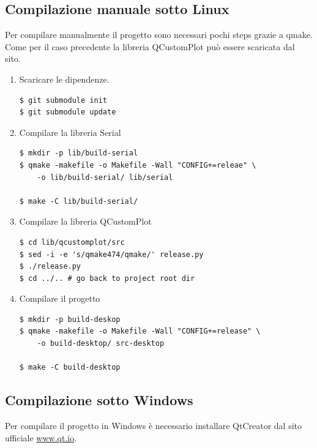 \subsection{Compilazione manuale sotto Linux}
Per compilare manualmente il progetto sono necessari pochi steps grazie a
qmake. Come per il caso precedente la libreria QCustomPlot pu\`o essere
scaricata dal sito.

\begin{enumerate}
\item Scaricare le dipendenze.
\begin{Verbatim}[frame=single]
$ git submodule init
$ git submodule update
\end{Verbatim}

\item Compilare la libreria Serial
\begin{Verbatim}[frame=single]
$ mkdir -p lib/build-serial
$ qmake -makefile -o Makefile -Wall "CONFIG+=releae" \
    -o lib/build-serial/ lib/serial

$ make -C lib/build-serial/
\end{Verbatim}

\item Compilare la libreria QCustomPlot
\begin{Verbatim}[frame=single]
$ cd lib/qcustomplot/src
$ sed -i -e 's/qmake474/qmake/' release.py
$ ./release.py
$ cd ../.. # go back to project root dir
\end{Verbatim}

\item Compilare il progetto
\begin{Verbatim}[frame=single]
$ mkdir -p build-deskop
$ qmake -makefile -o Makefile -Wall "CONFIG+=release" \
    -o build-desktop/ src-desktop

$ make -C build-desktop
\end{Verbatim}
\end{enumerate}

\subsection{Compilazione sotto Windows}
Per compilare il progetto in Windows \`e necessario installare QtCreator dal
sito ufficiale \url{www.qt.io}.

